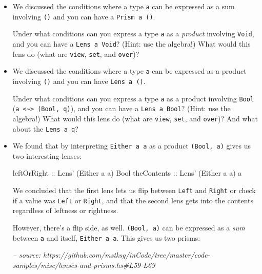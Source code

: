 \documentclass[]{article}
\newenvironment{Shaded}{}{}
\newcommand{\CommentTok}[1]{\textcolor[rgb]{0.38,0.63,0.69}{\textit{#1}}}
\newcommand{\DataTypeTok}[1]{\textcolor[rgb]{0.56,0.13,0.00}{#1}}
\newcommand{\NormalTok}[1]{#1}
\newcommand{\OtherTok}[1]{\textcolor[rgb]{0.00,0.44,0.13}{#1}}
\begin{document}
\begin{itemize}
\item
  We discussed the conditions where a type \texttt{a} can be expressed as a sum
  involving \texttt{()} and you can have a
  \texttt{Prism\textquotesingle{}\ a\ ()}.

  Under what conditions can you express a type \texttt{a} as a \emph{product}
  involving \texttt{Void}, and you can have a
  \texttt{Lens\textquotesingle{}\ a\ Void}? (Hint: use the algebra!) What would
  this lens do (what are \texttt{view}, \texttt{set}, and \texttt{over})?
\item
  We discussed the conditions where a type \texttt{a} can be expressed as a
  product involving \texttt{()} and you can have
  \texttt{Lens\textquotesingle{}\ a\ ()}.

  Under what conditions can you express a type \texttt{a} as a product involving
  \texttt{Bool}
  (\texttt{a\ \textless{}\textasciitilde{}\textgreater{}\ (Bool,\ q)}), and you
  can have a \texttt{Lens\textquotesingle{}\ a\ Bool}? (Hint: use the algebra!)
  What would this lens do (what are \texttt{view}, \texttt{set}, and
  \texttt{over})? And what about the \texttt{Lens\textquotesingle{}\ a\ q}?
\item
  We found that by interpreting \texttt{Either\ a\ a} as a product
  \texttt{(Bool,\ a)} gives us two interesting lenses:

\begin{Shaded}
\begin{Highlighting}[]
\OtherTok{leftOrRight ::} \DataTypeTok{Lens'}\NormalTok{ (}\DataTypeTok{Either}\NormalTok{ a a) }\DataTypeTok{Bool}
\OtherTok{theContents ::} \DataTypeTok{Lens'}\NormalTok{ (}\DataTypeTok{Either}\NormalTok{ a a) a}
\end{Highlighting}
\end{Shaded}

  We concluded that the first lens lets us flip between \texttt{Left} and
  \texttt{Right} or check if a value was \texttt{Left} or \texttt{Right}, and
  that the second lens gets into the contents regardless of leftness or
  rightness.

  However, there's a flip side, as well. \texttt{(Bool,\ a)} can be expressed as
  a \emph{sum} between \texttt{a} and itself, \texttt{Either\ a\ a}. This gives
  us two prisms:

\begin{Shaded}
\begin{Highlighting}[]
\CommentTok{-- source: https://github.com/mstksg/inCode/tree/master/code-samples/misc/lenses-and-prisms.hs#L59-L69}


\end{Highlighting}
\end{Shaded}
\end{itemize}
\end{document}
